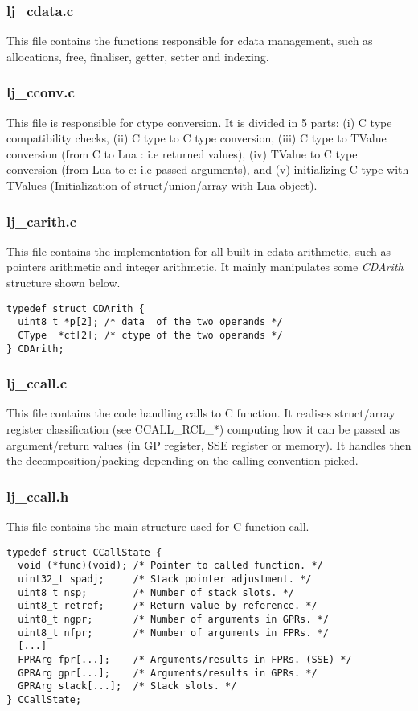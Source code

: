 \subsubsection{lj\_cdata.c}
This file contains the functions responsible for cdata management, such as
allocations, free, finaliser, getter, setter and indexing.

\subsubsection{lj\_cconv.c}
This file is responsible for ctype conversion. It is divided in 5 parts: (i) C type
compatibility checks, (ii) C type to C type conversion, (iii) C type to TValue conversion
(from C to Lua : i.e returned values), (iv) TValue to C type conversion (from Lua to
c: i.e passed arguments), and (v) initializing C type with TValues (Initialization
of struct/union/array with Lua object).

\subsubsection{lj\_carith.c}
This file contains the implementation for all built-in cdata arithmetic, such
as pointers arithmetic and integer arithmetic. It mainly manipulates some
\emph{CDArith} structure shown below.
\begin{lstlisting}[style=CStyle]
typedef struct CDArith {
  uint8_t *p[2]; /* data  of the two operands */
  CType  *ct[2]; /* ctype of the two operands */
} CDArith;
\end{lstlisting}

\subsubsection{lj\_ccall.c}
This file contains the code handling calls to C function. It realises struct/array
register classification (see CCALL\_RCL\_*) computing how it can be passed
as argument/return values (in GP register, SSE register or memory). It handles
then the decomposition/packing depending on the calling convention picked.

\subsubsection{lj\_ccall.h}
This file contains the main structure used for C function call.
\begin{lstlisting}[style=CStyle]
typedef struct CCallState {
  void (*func)(void); /* Pointer to called function. */
  uint32_t spadj;     /* Stack pointer adjustment. */
  uint8_t nsp;        /* Number of stack slots. */
  uint8_t retref;     /* Return value by reference. */
  uint8_t ngpr;       /* Number of arguments in GPRs. */
  uint8_t nfpr;       /* Number of arguments in FPRs. */
  [...]
  FPRArg fpr[...];    /* Arguments/results in FPRs. (SSE) */
  GPRArg gpr[...];    /* Arguments/results in GPRs. */
  GPRArg stack[...];  /* Stack slots. */
} CCallState;
\end{lstlisting}

